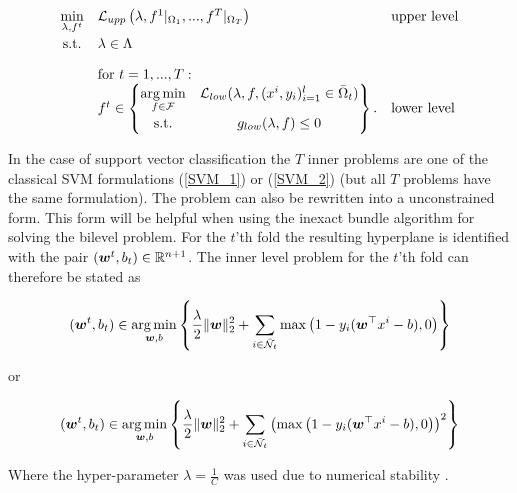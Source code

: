 
\begin{equation}
	\begin{array}{cll}
	\displaystyle\min_{\lambda, f^t} & \mathcal{L}_{upp}\left(\lambda,f^1|_{\Omega_1},...,f^T|_{\Omega_T}\right) & \text{upper level} \vspace{0.5ex}\\
	\text{s.t.} & \lambda \in \Lambda & \vspace{1em}\\
	& \text{for } t = 1,...,T: & \\
	& f^t \in \begin{Bmatrix} \displaystyle\argmin_{f\in \mathcal{F}} & \mathcal{L}_{low}(\lambda,f,(x^i,y_i)_{i = 1}^l\in \bar{\Omega}_t) \vspace{0.5ex}\\
	                        \text{s.t.} & g_{low}(\lambda,f) \leq 0 
													\end{Bmatrix}. & \text{lower level}
	\end{array}
\end{equation}

In the case of support vector classification the \(T\) inner problems are one of the classical SVM formulations (\ref{SVM_1}) or (\ref{SVM_2}) (but all \(T\) problems have the same formulation).
The problem can also be rewritten into a unconstrained form. This form will be helpful when using the inexact bundle algorithm for solving the bilevel problem.
For the \(t\)'th fold the resulting hyperplane is identified with the pair \((\bm{w}^t,b_t) \in \mathbb{R}^{n+1}\).
The inner level problem for the \(t\)'th fold can therefore be stated as

\begin{equation}
	(\bm{w}^t,b_t) \in \operatorname*{arg\,min}_{\bm{w},b}\left\{ \frac{\lambda}{2} \|\bm{w}\|^2_2+\sum_{i\in \bar{\mathcal{N}}_t}{\max\left(1-y_i(\bm{w}^{\top}x^i-b),0\right)}\right\}
\label{lower_t_1}
\end{equation}

or

\begin{equation}
	(\bm{w}^t,b_t) \in \operatorname*{arg\,min}_{\bm{w},b} \left\{\frac{\lambda}{2} \|\bm{w}\|^2_2+\sum_{i\in \bar{\mathcal{N}}_t}{\left(\max\left(1-y_i(\bm{w}^{\top}x^i-b),0\right)\right)^2}\right\}
\label{lower_t_2}
\end{equation}

Where the hyper-parameter \(\lambda = \frac{1}{C}\) was used  due to numerical stability \cite{Kunapuli2008}.

